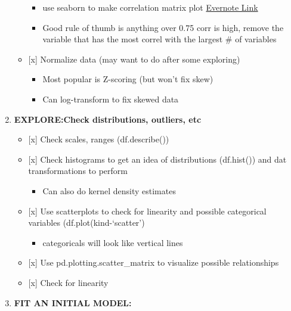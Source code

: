 \documentclass[11pt]{article}
\providecommand{\tightlist}{%
      \setlength{\itemsep}{0pt}\setlength{\parskip}{0pt}}
\begin{document}
\begin{enumerate}
\begin{itemize}
    \begin{itemize}
    \tightlist
    \item
      use seaborn to make correlation matrix plot
      \href{https://www.evernote.com/l/AArNyaEwjA5JUL6I9PazHs_ts_hU-m7ja1I/}{Evernote
      Link}
    \item
      Good rule of thumb is anything over 0.75 corr is high, remove the
      variable that has the most correl with the largest \# of variables
    \end{itemize}
  \item
    {[}x{]} Normalize data (may want to do after some exploring)

    \begin{itemize}
    \tightlist
    \item
      Most popular is Z-scoring (but won't fix skew)
    \item
      Can log-transform to fix skewed data
    \end{itemize}
  \end{itemize}
\item
  \textbf{EXPLORE:Check distributions, outliers, etc}

  \begin{itemize}
  \tightlist
  \item
    {[}x{]} Check scales, ranges (df.describe())
  \item
    {[}x{]} Check histograms to get an idea of distributions (df.hist())
    and dat transformations to perform

    \begin{itemize}
    \tightlist
    \item
      Can also do kernel density estimates
    \end{itemize}
  \item
    {[}x{]} Use scatterplots to check for linearity and possible
    categorical variables (df.plot(kind-`scatter')

    \begin{itemize}
    \tightlist
    \item
      categoricals will look like vertical lines
    \end{itemize}
  \item
    {[}x{]} Use pd.plotting.scatter\_matrix to visualize possible
    relationships
  \item
    {[}x{]} Check for linearity
  \end{itemize}
\item
  \textbf{FIT AN INITIAL MODEL:}


\end{enumerate}
\end{document}
